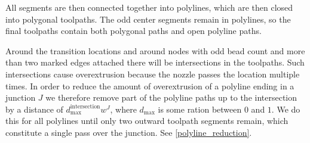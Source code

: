 All segments are then connected together into polylines, which are then closed into polygonal toolpaths.
The odd center segments remain in polylines, so the final toolpaths contain both polygonal paths and open polyline paths.

Around the transition locations and around nodes with odd bead count and more than two marked edges attached there will be intersections in the toolpaths.
Such intersections cause overextrusion because the nozzle passes the location multiple times.
In order to reduce the amount of overextrusion of a polyline ending in a junction $J$ we therefore remove part of the polyline paths up to the intersection by a distance of $d_\text{max}^\text{intersection} w^J$, where $d_\text{max}$ is some ration between $0$ and $1$.
We do this for all polylines until only two outward toolpath segments remain, which constitute a single pass over the junction.
See \cref{polyline_reduction}.



